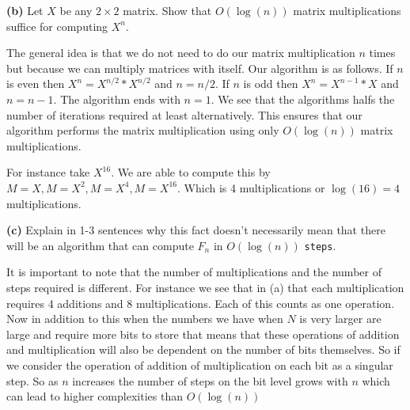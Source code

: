 \documentclass[12pt]{article}
\newcommand{\hint}[1]{{\footnotesize
    \begin{description}
    [leftmargin=3.3em,style=nextline]
        \item[Hint:] {#1}
    \end{description}}   
}
\begin{document}
\textbf{(b)} Let $X$ be any $2 \times 2$ matrix. Show that $O(\log(n))$ matrix multiplications suffice for computing $X^n$.
\hspace{1em}\hint{think about computing $X^{16}$}
\begin{answer}
    The general idea is that we do not need to do our matrix multiplication $n$ times but because we can multiply matrices with itself. Our algorithm is as follows. If $n$ is even then $X^{n} = X^{n/2} * X^{n /2}$ and  $n = n /2$. If  $n$ is odd then $X^{n } = X^{n- 1} * X$ and $n = n - 1$. The algorithm ends with  $n = 1$. We see that the algorithms halfs the number of iterations required at least alternatively. This ensures that our algorithm performs the matrix multiplication using only  $O(\log(n))$ matrix multiplications.

    For instance take  $X^{16}$. We are able to compute this by $M = X, M = X^2, M = X^{4}, M = X^{16}$. Which is 4 multiplications or $\log(16) = 4$ multiplications.
\end{answer}



\textbf{(c)} Explain in 1-3 sentences why this fact doesn't necessarily mean that there will be an algorithm that can compute $F_n$ in $O(\log(n))$ \texttt{steps}.
\begin{answer}
    It is important to note that the number of multiplications and the number of steps required is different. For instance we see that in (a) that each multiplication requires 4 additions and 8 multiplications. Each of this counts as one operation. Now in addition to this when the numbers we have when $N$ is very larger are large and require more bits to store that means that these operations of addition and multiplication will also be dependent on the number of bits themselves. So if we consider the operation of addition of multiplication on each bit as a singular step. So as $n$ increases the number of steps on the bit level grows with $n$ which can lead to higher complexities than $O(\log(n))$
\end{answer}
\end{document}
